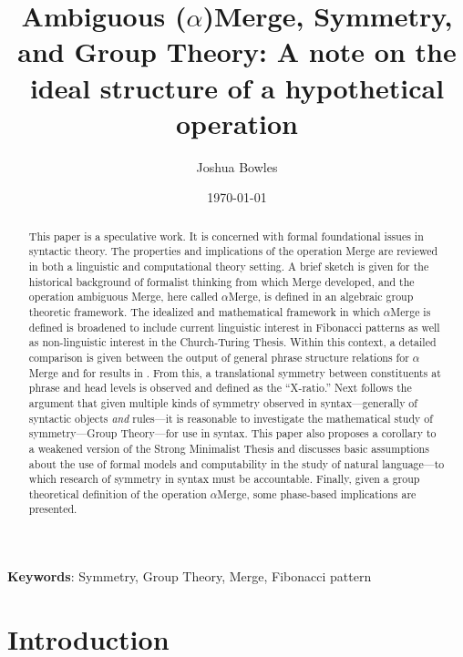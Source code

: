 \documentclass[11pt,twoside]{article}
\begin{document}
\title{Ambiguous ($\alpha$)Merge, Symmetry, and Group Theory: A note on the ideal structure of a hypothetical operation}

\author{Joshua Bowles}

\date{\today}
\maketitle

\begin{abstract} This paper is a speculative work. It is concerned with formal foundational issues in syntactic theory. The properties and implications of the operation Merge are reviewed in both a linguistic and computational theory setting. A brief sketch is given for the historical background of formalist thinking from which Merge developed, and the operation ambiguous Merge, here called $\alpha$Merge, is defined in an algebraic group theoretic framework. The idealized and mathematical framework in which $\alpha$Merge is defined is broadened to include current linguistic interest in Fibonacci patterns as well as non-linguistic interest in the Church-Turing Thesis. Within this context, a detailed comparison is given between the output of general phrase structure relations for $\alpha$Merge and for results in \cite{medeiros:2008}. From this, a translational symmetry between constituents at phrase and head levels is observed and defined as the ``X-ratio.'' Next follows the argument that given multiple kinds of symmetry observed in syntax---generally of syntactic objects \textsl{and} rules---it is reasonable to investigate the mathematical study of symmetry---Group Theory---for use in syntax. This paper also proposes a corollary to a weakened version of the Strong Minimalist Thesis and discusses basic assumptions about the use of formal models and computability in the study of natural language---to which research of symmetry in syntax must be accountable. Finally, given a group theoretical definition of the operation $\alpha$Merge, some phase-based implications are presented.  
\end{abstract}
\textbf{Keywords}: Symmetry, Group Theory, Merge, Fibonacci pattern\\




\section{Introduction}\label{intro}
\end{document}
